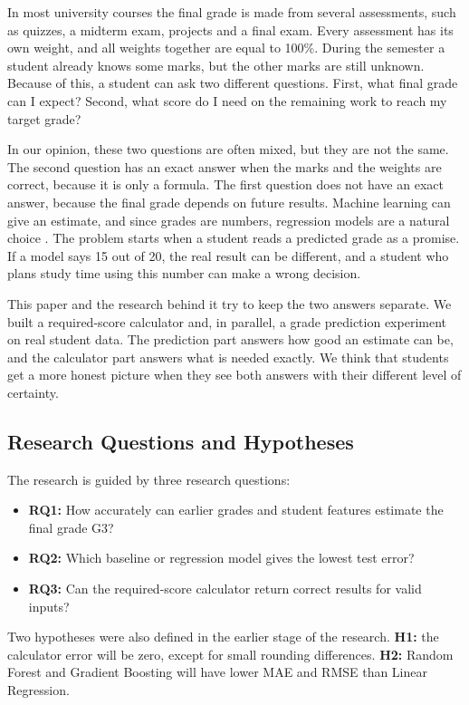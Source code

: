 \documentclass[10pt,twocolumn,a4paper]{article}
\newcommand{\Gthree}{G3}
\begin{document}
In most university courses the final grade is made from several assessments, such as quizzes, a midterm exam, projects and a final exam. Every assessment has its own weight, and all weights together are equal to 100\%. During the semester a student already knows some marks, but the other marks are still unknown. Because of this, a student can ask two different questions. First, what final grade can I expect? Second, what score do I need on the remaining work to reach my target grade?

In our opinion, these two questions are often mixed, but they are not the same. The second question has an exact answer when the marks and the weights are correct, because it is only a formula. The first question does not have an exact answer, because the final grade depends on future results. Machine learning can give an estimate, and since grades are numbers, regression models are a natural choice \cite{breiman2001,pedregosa2011}. The problem starts when a student reads a predicted grade as a promise. If a model says 15 out of 20, the real result can be different, and a student who plans study time using this number can make a wrong decision.

This paper and the research behind it try to keep the two answers separate. We built a required-score calculator and, in parallel, a grade prediction experiment on real student data. The prediction part answers how good an estimate can be, and the calculator part answers what is needed exactly. We think that students get a more honest picture when they see both answers with their different level of certainty.

\subsection{Research Questions and Hypotheses}
The research is guided by three research questions:
\begin{itemize}
  \item \textbf{RQ1:} How accurately can earlier grades and student features estimate the final grade \Gthree?
  \item \textbf{RQ2:} Which baseline or regression model gives the lowest test error?
  \item \textbf{RQ3:} Can the required-score calculator return correct results for valid inputs?
\end{itemize}
Two hypotheses were also defined in the earlier stage of the research. \textbf{H1:} the calculator error will be zero, except for small rounding differences. \textbf{H2:} Random Forest and Gradient Boosting will have lower MAE and RMSE than Linear Regression.
\end{document}
